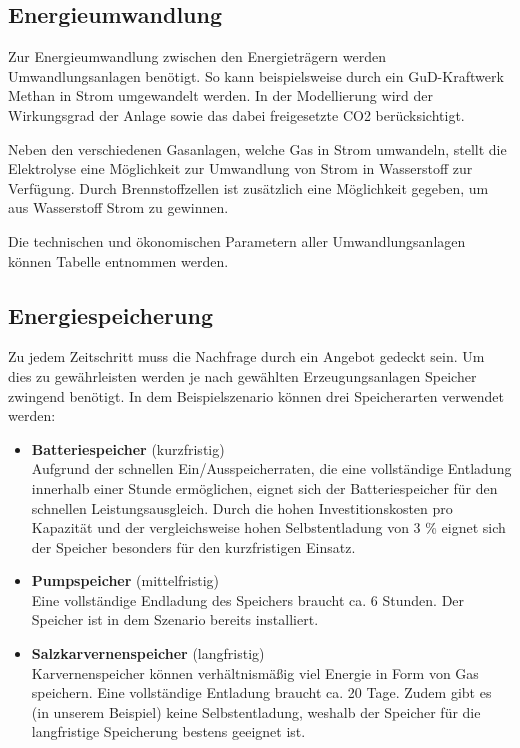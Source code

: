 
\subsection{Energieumwandlung}
Zur Energieumwandlung zwischen den Energieträgern werden Umwandlungsanlagen benötigt. So kann beispielsweise durch ein GuD-Kraftwerk Methan in Strom umgewandelt werden. In der Modellierung wird der Wirkungsgrad der Anlage sowie das dabei freigesetzte CO2 berücksichtigt. 

Neben den verschiedenen Gasanlagen, welche Gas in Strom umwandeln, stellt die Elektrolyse eine Möglichkeit zur Umwandlung von Strom in Wasserstoff zur Verfügung. Durch Brennstoffzellen ist zusätzlich eine Möglichkeit gegeben, um aus Wasserstoff Strom zu gewinnen.

Die technischen und ökonomischen Parametern aller Umwandlungsanlagen können Tabelle  entnommen werden.

\subsection{Energiespeicherung}
Zu jedem Zeitschritt muss die Nachfrage durch ein Angebot gedeckt sein. Um dies zu gewährleisten werden je nach gewählten Erzeugungsanlagen Speicher zwingend benötigt.
In dem Beispielszenario können drei Speicherarten verwendet werden:
\begin{itemize}
    \item \textbf{Batteriespeicher} (kurzfristig)\\Aufgrund der schnellen Ein/Ausspeicherraten, die eine vollständige Entladung innerhalb einer Stunde ermöglichen, eignet sich der Batteriespeicher für den schnellen Leistungsausgleich. Durch die hohen Investitionskosten pro Kapazität und der vergleichsweise hohen Selbstentladung von 3 \% eignet sich der Speicher besonders für den kurzfristigen Einsatz.
    \item \textbf{Pumpspeicher} (mittelfristig)\\Eine vollständige Endladung des Speichers braucht ca. 6 Stunden. Der Speicher ist in dem Szenario bereits installiert.
    \item \textbf{Salzkarvernenspeicher} (langfristig)\\Karvernenspeicher können verhältnismäßig viel Energie in Form von Gas speichern. Eine vollständige Entladung braucht ca. 20 Tage. Zudem gibt es (in unserem Beispiel) keine Selbstentladung, weshalb der Speicher für die langfristige Speicherung bestens geeignet ist.   
\end{itemize}    

